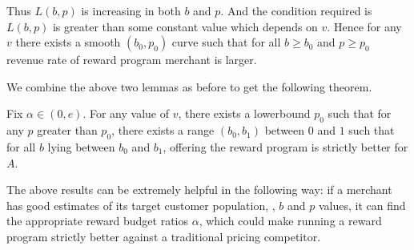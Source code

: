 Thus $L(b,p)$ is increasing in both $b$ and $p$. And the condition required is $L(b,p)$ is greater than some constant value which depends on $v$.
Hence for any $v$ there exists a smooth $(b_0,p_0)$ curve such that for all $b\ge b_0$ and $p\ge p_0$ revenue rate of reward program merchant is larger.

\endproof

We combine the above two lemmas as before to get the following theorem.

\begin{theorem}
Fix $\alpha \in (0, e)$. 
For any value of $v$, there exists a lowerbound $p_0$ such that for any $p$ greater than $p_0$, there exists a range $(b_0, b_1)$ between $0$ and $1$ such that for all $b$ lying between $b_0$ and $b_1$, offering the reward program is strictly better for $A$. 
\end{theorem}

The above results can be extremely helpful in the following way: if a merchant has good estimates of its target customer population, \ie, $b$ and $p$ values, it can find the appropriate reward budget ratios $\alpha$, which could make running a reward program strictly better against a traditional pricing competitor.
